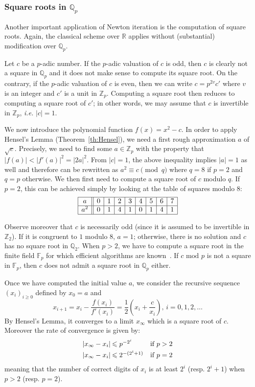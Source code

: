 \documentclass[11pt]{article}
\numberwithin{equation}{section}
\numberwithin{figure}{section}
\renewcommand{\leq}{\leqslant}
\renewcommand{\geq}{\geqslant}
\theoremstyle{definition}
\newcommand{\Z}{\mathbb Z}
\newcommand{\Zp}{\Z_p}
\newcommand{\Q}{\mathbb Q}
\newcommand{\Qp}{\Q_p}
\newcommand{\F}{\mathbb F}
\newcommand{\Fp}{\F_p}
\newcommand{\R}{\mathbb R}
\begin{document}
\subsubsection{Square roots in $\Qp$}
\label{sssec:sqrt}

Another important application of Newton iteration is the computation
of square roots. Again, the classical scheme over $\R$ applies without
(substantial) modification over $\Qp$.

Let $c$ be a $p$-adic number. If the $p$-adic valuation of $c$ is odd, 
then $c$ is clearly not a square in $\Qp$ and it does not make sense to 
compute its square root. On the contrary, if the $p$-adic valuation of 
$c$ is even, then we can write $c = p^{2v} c'$ where $v$ is an integer and 
$c'$ is a unit in $\Zp$. Computing a square root then reduces to 
computing a square root of $c'$; in other words, we may assume that $c$ 
is invertible in $\Zp$, \emph{i.e.} $|c| = 1$.

We now introduce the polynomial function $f(x) = x^2 - c$. In order to 
apply Hensel's Lemma (Theorem~\ref{th:Hensel}), we need a first rough
approximation $a$ of $\sqrt c$. Precisely, we need to find some $a \in 
\Zp$ with the property that $|f(a)| < |f'(a)|^2 = |2a|^2$. From $|c| = 
1$, the above inequality implies $|a| = 1$ as well and therefore can be
rewritten as 
$a^2 \equiv c \pmod q$ where $q = 8$ if $p = 2$ and $q = p$ otherwise.
We then first need to compute a square root of $c$ modulo $q$. If $p=2$,
this can be achieved simply by looking at the table of squares modulo $8$:
$$\begin{array}{|c||c|c|c|c|c|c|c|c|}
\hline
a & 0 & 1 & 2 & 3 & 4 & 5 & 6 & 7 \\
\hline
a^2 & 0 & 1 & 4 & 1 & 0 & 1 & 4 & 1 \\
\hline
\end{array}$$

Observe moreover that $c$ is necessarily odd (since it is assumed to be
invertible in $\Z_2$). If it is congruent to $1$
modulo $8$, $a = 1$; otherwise, there is no solution
and $c$ has no square root in $\Q_2$.
When $p > 2$, we have to compute a square root in the finite field $\Fp$
for which efficient algorithms are known~\cite[\S 1.5]{Co93}. If 
$c \text{ mod }p$ is not a square in $\Fp$, then $c$ does not admit a square root 
in $\Qp$ either.

Once we have computed the initial value $a$, we consider the recursive
sequence $(x_i)_{i \geq 0}$ defined by $x_0 = a$ and
$$x_{i+1} = x_i - \frac{f(x_i)}{f'(x_i)} = \frac 1 2  \left( x_i
+ \frac c {x_i} \right), \, i = 0, 1, 2, \ldots$$
By Hensel's Lemma, it converges to a limit $x_\infty$ which is a square
root of $c$. Moreover the rate of convergence is given by:
$$\begin{array}{r@{\hspace{0.5ex}}ll}
|x_\infty - x_i| & \leq p^{-2^i} & \text{if } p > 2 \smallskip \\
|x_\infty - x_i| & \leq 2^{-(2^i+1)} & \text{if } p = 2
\end{array}$$
meaning that the number of correct digits of $x_i$ is at least $2^i$ 
(resp. $2^i + 1$) when $p > 2$ (resp. $p = 2$).
\end{document}

